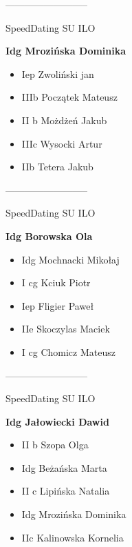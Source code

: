 \documentclass[a4paper,10pt]{article}
\begin{document}
\begin{multicols}{3}
\begin{minipage}[l]{\textwidth}
\end{minipage}



\begin{minipage}[l]{\textwidth}
--------------------------

  \footnotesize{SpeedDating SU ILO}

  \bfseries{Idg Mrozińska Dominika}

  \begin{itemize}
    \item Iep Zwoliński jan
    \item IIIb Początek Mateusz
    \item II b Możdżeń Jakub
    \item IIIc Wysocki Artur
    \item IIb Tetera Jakub

    \end{itemize}



\end{minipage}



\begin{minipage}[l]{\textwidth}
--------------------------

  \footnotesize{SpeedDating SU ILO}

  \bfseries{Idg Borowska Ola}

  \begin{itemize}
    \item Idg Mochnacki Mikołaj
    \item I cg Kciuk Piotr
    \item Iep Fligier Paweł
    \item IIe Skoczylas Maciek
    \item I cg Chomicz Mateusz

    \end{itemize}



\end{minipage}



\begin{minipage}[l]{\textwidth}
--------------------------

  \footnotesize{SpeedDating SU ILO}

  \bfseries{Idg Jałowiecki Dawid}

  \begin{itemize}
    \item II b Szopa Olga
    \item Idg Beżańska Marta
    \item II c Lipińska Natalia
    \item Idg Mrozińska Dominika
    \item IIc Kalinowska Kornelia


\end{itemize}
\end{minipage}
\end{multicols}
\end{document}
